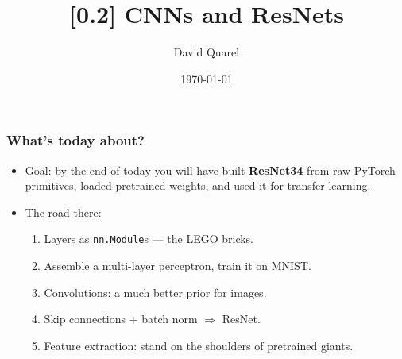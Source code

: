 \providecommand{\HANDOUT}{1}


\newcommand{\R}{\mathbb{R}}



\title[{[0.2] CNNs and ResNets}]
{{[0.2] CNNs and ResNets}}

\author[David Quarel]
{David Quarel}


\date[\today]
{\today}

\frame{\titlepage}

\begin{frame}
\frametitle{What's today about?}
\begin{itemize}
    \item Goal: by the end of today you will have built \textbf{ResNet34} from raw
    PyTorch primitives, loaded pretrained weights, and used it for transfer learning.
    \pause
    \item The road there:
    \begin{enumerate}
        \item Layers as \texttt{nn.Module}s --- the LEGO bricks.
        \pause
        \item Assemble a multi-layer perceptron, train it on MNIST.
        \pause
        \item Convolutions: a much better prior for images.
        \pause
        \item Skip connections + batch norm $\Rightarrow$ ResNet.
        \pause
        \item Feature extraction: stand on the shoulders of pretrained giants.
    \end{enumerate}
\end{itemize}
\end{frame}

